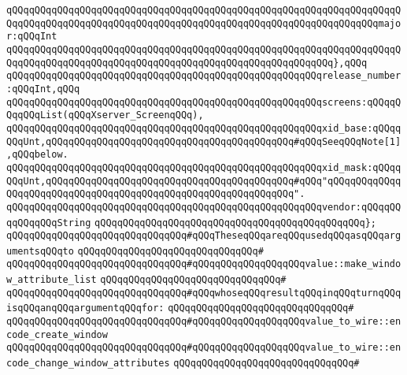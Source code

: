 \verb|qQQqqQQqqQQqqQQqqQQqqQQqqQQqqQQqqQQqqQQqqQQqqQQqqQQqqQQqqQQqqQQqqQQqqQQqqQQqqQQqqQQqqQQqqQQqqQQqqQQqqQQqqQQqqQQqqQQqqQQqqQQqqQQqqQQqqQQqmajor:qQQqInt|\newline
\verb|qQQqqQQqqQQqqQQqqQQqqQQqqQQqqQQqqQQqqQQqqQQqqQQqqQQqqQQqqQQqqQQqqQQqqQQqqQQqqQQqqQQqqQQqqQQqqQQqqQQqqQQqqQQqqQQqqQQqqQQqqQQqqQQq},qQQq|\newline
\verb|qQQqqQQqqQQqqQQqqQQqqQQqqQQqqQQqqQQqqQQqqQQqqQQqqQQqqQQqrelease_number:qQQqInt,qQQq|\newline
\newline
\verb|qQQqqQQqqQQqqQQqqQQqqQQqqQQqqQQqqQQqqQQqqQQqqQQqqQQqqQQqscreens:qQQqqQQqqQQqList(qQQqXserver_ScreenqQQq),|\newline
\newline
\verb|qQQqqQQqqQQqqQQqqQQqqQQqqQQqqQQqqQQqqQQqqQQqqQQqqQQqqQQqxid_base:qQQqqQQqUnt,qQQqqQQqqQQqqQQqqQQqqQQqqQQqqQQqqQQqqQQqqQQq#qQQqSeeqQQqNote[1],qQQqbelow.|\newline
\verb|qQQqqQQqqQQqqQQqqQQqqQQqqQQqqQQqqQQqqQQqqQQqqQQqqQQqqQQqxid_mask:qQQqqQQqUnt,qQQqqQQqqQQqqQQqqQQqqQQqqQQqqQQqqQQqqQQqqQQq#qQQq"qQQqqQQqqQQqqQQqqQQqqQQqqQQqqQQqqQQqqQQqqQQqqQQqqQQqqQQqqQQqqQQq".|\newline
\newline
\verb|qQQqqQQqqQQqqQQqqQQqqQQqqQQqqQQqqQQqqQQqqQQqqQQqqQQqqQQqvendor:qQQqqQQqqQQqqQQqString|\newline
\verb|qQQqqQQqqQQqqQQqqQQqqQQqqQQqqQQqqQQqqQQqqQQqqQQq};|\newline
\newline
\verb|qQQqqQQqqQQqqQQqqQQqqQQqqQQqqQQq#qQQqTheseqQQqareqQQqusedqQQqasqQQqargumentsqQQqto|\newline
\verb|qQQqqQQqqQQqqQQqqQQqqQQqqQQqqQQq#|\newline
\verb|qQQqqQQqqQQqqQQqqQQqqQQqqQQqqQQq#qQQqqQQqqQQqqQQqqQQqvalue::make_window_attribute_list|\newline
\verb|qQQqqQQqqQQqqQQqqQQqqQQqqQQqqQQq#|\newline
\verb|qQQqqQQqqQQqqQQqqQQqqQQqqQQqqQQq#qQQqwhoseqQQqresultqQQqinqQQqturnqQQqisqQQqanqQQqargumentqQQqfor:|\newline
\verb|qQQqqQQqqQQqqQQqqQQqqQQqqQQqqQQq#|\newline
\verb|qQQqqQQqqQQqqQQqqQQqqQQqqQQqqQQq#qQQqqQQqqQQqqQQqqQQqvalue_to_wire::encode_create_window|\newline
\verb|qQQqqQQqqQQqqQQqqQQqqQQqqQQqqQQq#qQQqqQQqqQQqqQQqqQQqvalue_to_wire::encode_change_window_attributes|\newline
\verb|qQQqqQQqqQQqqQQqqQQqqQQqqQQqqQQq#|\newline
